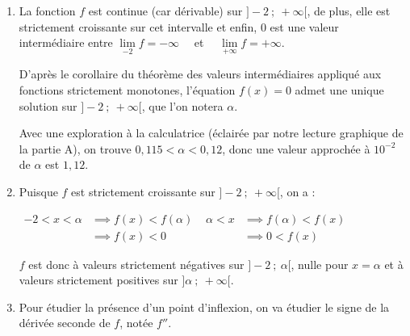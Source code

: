 \documentclass[10pt]{article}
\begin{document}
\begin{enumerate}
Le trinôme n'a donc pas de racines réelles, et a donc des images strictement positives pour tout $x$ réel.

$f'$ est donc une fonction à valeurs strictement positives sur $]-2~;~+\infty[$, et $f$ est donc strictement croissante sur $]-2~;~+\infty[$.

On peut donc établir le tableau de variations suivant :

	\hfill~\hfill~

\item La fonction $f$ est continue (car dérivable) sur $]-2~;~+\infty[$, de plus, elle est strictement croissante sur cet intervalle et enfin, 0 est une valeur intermédiaire entre $\lim\limits_{-2}f = -\infty$ ~~et~~ $\lim\limits_{+\infty}f = + \infty$.

D'après le corollaire du théorème des valeurs intermédiaires appliqué aux fonctions strictement monotones, l'équation $f(x) = 0$ admet une unique solution sur $]- 2~;~+\infty[$, que l'on notera $\alpha$.

Avec une exploration à la calculatrice (éclairée par notre lecture graphique de la partie A), on trouve $0,115 < \alpha < 0,12$, donc une valeur approchée à $10^{-2}$ de $\alpha$ est $1,12$.

\item Puisque $f$ est strictement croissante sur $]-2~;~+\infty[$, on a :

$\begin{aligned} -2 < x <\alpha &\implies f(x) < f(\alpha)\\
&\implies f(x) < 0\end{aligned}$ \hfill
$\begin{aligned} \alpha <x  &\implies  f(\alpha) < f(x)\\
&\implies 0< f(x) \end{aligned}$\hfill~

$f$ est donc à valeurs strictement négatives sur $]-2~;~\alpha[$, nulle pour $x = \alpha$ et à valeurs strictement positives sur $]\alpha~;~+\infty[$.

\item Pour étudier la présence d'un point d'inflexion, on va étudier le signe de la dérivée seconde de $f$, notée $f''$.


\end{enumerate}
\end{document}
